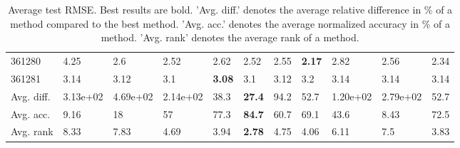 \begin{table}[ht!]
\begin{tabular}{lllllllllll}
  361280 & 4.25 & 2.6 & 2.52 & 2.62 & 2.52 & 2.55 & \textbf{2.17} & 2.82 & 2.56 & 2.34 \\ 
  361281 & 3.14 & 3.12 & 3.1 & \textbf{3.08} & 3.1 & 3.12 & 3.2 & 3.14 & 3.14 & 3.14 \\ 
   \hline
Avg. diff. & 3.13e+02 & 4.69e+02 & 2.14e+02 & 38.3 & \textbf{27.4} & 94.2 & 52.7 & 1.20e+02 & 2.79e+02 & 52.7 \\ 
  Avg. acc. & 9.16 & 18 & 57 & 77.3 & \textbf{84.7} & 60.7 & 69.1 & 43.6 & 8.43 & 72.5 \\ 
  Avg. rank & 8.33 & 7.83 & 4.69 & 3.94 & \textbf{2.78} & 4.75 & 4.06 & 6.11 & 7.5 & 3.83 \\ 
   \hline
\hline
\end{tabular}
\endgroup
\caption{Average test RMSE. 
                  Best results are bold. 
                  'Avg. diff.' denotes the average relative difference in \% of a method compared to the best method.
                  'Avg. acc.' denotes the average normalized accuracy in \% of a method.
                  'Avg. rank' denotes the average rank of a method.} 
\label{TABLES/table_results_RMSE_mahalanobis}
\end{table}
